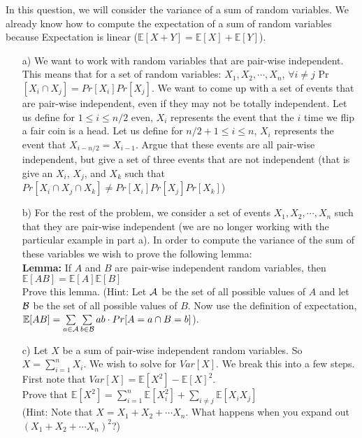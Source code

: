 \documentclass[]{article}
\def \exx {\mathbb{E}}
\begin{document}
\begin{qunlist}
\begin{enumerate}[a)]
\end{enumerate}


In this question, we will consider the variance of a sum of random variables. We already know how to compute the expectation of a sum of random variables because Expectation is linear ($\mathbb{E}[X+Y] = \mathbb{E}[X] + \mathbb{E}[Y]$).
\begin{enumerate}
\qpart
\item[a)] We want to work with random variables that are pair-wise independent. This means that for a set of random variables: $X_1, X_2, \cdots, X_n$, $\forall{i \neq} j $ Pr$[X_i \cap X_j] = Pr[X_i]Pr[X_j]$. We want to come up with a set of events that are pair-wise independent, even if they may not be totally independent. Let us define for $1 \leq i \leq n/2$ even, $X_i$ represents the event that the $i$ time we flip a fair coin is a head. Let us define for $n/2 + 1 \leq i \leq n$, $X_i$ represents the event that $X_{i-n/2} = X_{i-1}$. Argue that these events are all pair-wise independent, but give a set of three events that are not independent (that is give an $X_i$, $X_j$, and $X_k$ such that $Pr[X_i \cap X_j \cap X_k] \neq Pr[X_i]Pr[X_j]Pr[X_k]$)
\qpart
\item[b)] For the rest of the problem, we consider a set of events $X_1, X_2, \cdots, X_n$ such that they are pair-wise independent (we are no longer working with the particular example in part a). In order to compute the variance of the sum of these variables we wish to prove the following lemma: \\ \textbf{Lemma:} If $A$ and $B$ are pair-wise independent random variables, then $\exx[AB] = \exx[A] \exx[B]$ \\ Prove this lemma. (Hint: Let ${\cal A}$ be the set of all possible values of $A$ and let ${\cal B}$ be the set of all possible values of $B$. Now use the definition of expectation, $\exx[AB] = \sum\limits_{a \in \Aset} \sum\limits_{b \in \Bset} ab \cdot Pr[A=a \cap B = b]$).
\qpart
\item[c)] Let $X$ be a sum of pair-wise independent random variables. So $X = \sum\nolimits_{i=1}^n X_i$. We wish to solve for $Var[X]$. We break this into a few steps. First note that $Var[X] = \exx[X^2] - \exx[X]^2$. \\ Prove that $\exx[X^2] = \sum\nolimits_{i=1}^n \exx[X_i^2] + \sum\limits_{i \neq j} \exx[X_iX_j]$ \\ (Hint: Note that $X = X_1 + X_2 + \cdots X_n$. What happens when you expand out $(X_1 + X_2 + \cdots X_n)^2$?)

\end{enumerate}
\end{qunlist}
\end{document}
